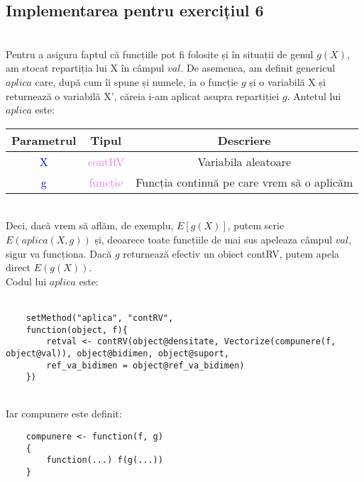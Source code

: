 \documentclass[12pt]{article}
\begin{document}
\subsection{Implementarea pentru exercițiul 6}\hfill \\
\indent Pentru a asigura faptul că funcțiile pot fi folosite și în situații de genul $g(X)$, am stocat repartiția lui X în câmpul $val$. De asemenea, am definit genericul $aplica$ care, după cum îi spune și numele, ia o funcție $g$ și o variabilă X și returnează o variabilă X', căreia i-am aplicat asupra repartiției $g$. Antetul lui $aplica$ este:
\begin{center}
	\begin{tabular}{|| c | c | c ||}
		\hline
		Parametrul & Tipul & Descriere \\
		\hline
		\textcolor{blue}{X} & \textcolor{violet}{contRV} & Variabila aleatoare\\
		\hline
		\textcolor{blue}{g} & \textcolor{violet}{funcție} & Funcția continuă pe care vrem să o aplicăm\\
		\hline
	\end{tabular}
\end{center}\hfill \\
\indent Deci, dacă vrem să aflăm, de exemplu, $E[g(X)]$, putem scrie $E(aplica(X, g))$ și, deoarece toate funcțiile de mai sus apeleaza câmpul $val$, sigur va funcționa. Dacă $g$ returnează efectiv un obiect contRV, putem apela direct $E(g(X))$. \\
\indent Codul lui $aplica$ este:\\\\
\begin{lstlisting}
	setMethod("aplica", "contRV",
	function(object, f){
		retval <- contRV(object@densitate, Vectorize(compunere(f, object@val)), object@bidimen, object@suport,
		ref_va_bidimen = object@ref_va_bidimen)
	})
\end{lstlisting}\hfill \\
\indent Iar compunere este definit:
\begin{lstlisting}
	compunere <- function(f, g)
	{
		function(...) f(g(...))
	}
\end{lstlisting}
\end{document}
